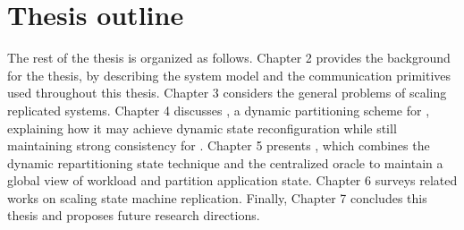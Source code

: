 \section{Thesis outline}
\label{sec:structure}

The rest of the thesis is organized as follows. Chapter 2 provides the
background for the thesis, by describing the system model and the communication
primitives used throughout this thesis. Chapter 3 considers the general problems
of scaling replicated systems. Chapter 4 discusses \dssmr, a dynamic
partitioning scheme for \smr, explaining how it may achieve dynamic state
reconfiguration while still maintaining strong consistency for \smr. Chapter 5
presents \dynastar, which combines the dynamic repartitioning state technique
and the centralized oracle to maintain a global view of workload and partition
application state. Chapter 6 surveys related works on scaling state machine
replication. Finally, Chapter 7 concludes this thesis and proposes future
research directions.
